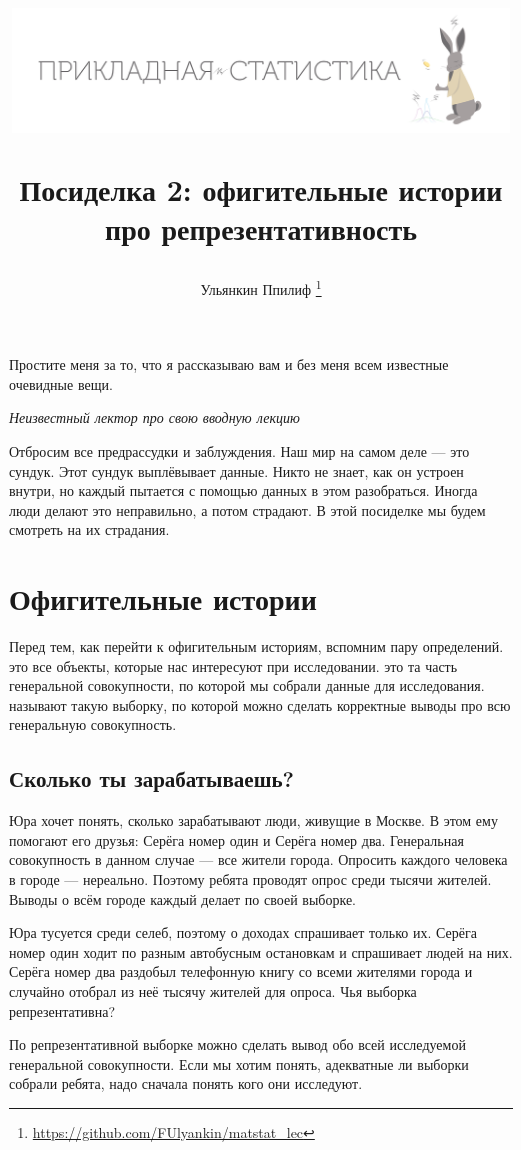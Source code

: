 \documentclass[12pt, a4paper, oneside]{article}
\title{
\begin{center} 
\includegraphics[width=0.99\textwidth]{logo.png}
\end{center}

Посиделка 2: офигительные истории про репрезентативность}
\date{ } %
\author{Ульянкин Ппилиф \thanks{\url{https://github.com/FUlyankin/matstat_lec}}}
\begin{document}

\maketitle

\epigraph{Простите меня за то, что я рассказываю вам и без меня всем известные очевидные вещи.}{\textit{Неизвестный лектор про свою вводную лекцию}}

Отбросим все предрассудки и заблуждения. Наш мир на самом деле --- это сундук. Этот сундук выплёвывает данные. Никто не знает, как он устроен внутри, но каждый пытается с помощью данных в этом разобраться. Иногда люди делают это неправильно, а потом страдают. В этой посиделке мы будем смотреть на их страдания.

\section{Офигительные истории}

Перед тем, как перейти к офигительным историям, вспомним пару определений.  это все объекты, которые нас интересуют при исследовании.   это та часть генеральной совокупности, по которой мы собрали данные для исследования.  называют такую выборку, по которой можно сделать корректные выводы про всю генеральную совокупность. 

\subsection{Сколько ты зарабатываешь?}

Юра хочет понять, сколько зарабатывают люди, живущие в Москве. В этом ему помогают его друзья: Серёга номер один и Серёга номер два. Генеральная совокупность в данном случае --- все жители города. Опросить каждого человека в городе --- нереально. Поэтому ребята проводят опрос среди тысячи жителей. Выводы о всём городе каждый делает по своей выборке.  

Юра тусуется среди селеб, поэтому о доходах спрашивает только их. Серёга номер один ходит по разным автобусным остановкам и спрашивает людей на них. Серёга номер два раздобыл телефонную книгу со всеми жителями города и случайно отобрал из неё тысячу жителей для опроса. Чья выборка репрезентативна? 

По репрезентативной выборке можно сделать вывод обо всей исследуемой генеральной совокупности. Если мы хотим понять, адекватные ли выборки собрали ребята, надо сначала понять кого они исследуют. 
\end{document}
